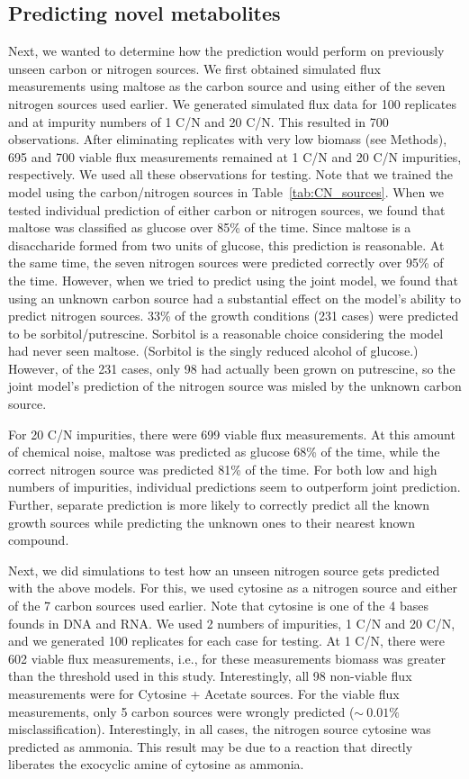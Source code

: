 \documentclass[12pt]{article}
\begin{document}
\subsection{Predicting novel metabolites}

Next, we wanted to determine how the prediction would perform on previously unseen carbon or nitrogen sources. We first obtained simulated flux measurements using maltose as the carbon source and using either of the seven nitrogen sources used earlier. We generated simulated flux data for 100 replicates and at impurity numbers of 1 C/N and 20 C/N. This resulted in 700 observations. After eliminating replicates with very low biomass (see Methods), 695 and 700 viable flux measurements remained at 1 C/N and 20 C/N impurities, respectively. We used all these observations for testing. Note that we trained the model using the carbon/nitrogen sources in Table~\ref{tab:CN_sources}. When we tested individual prediction of either carbon or nitrogen sources, we found that maltose was classified as glucose over 85\% of the time. Since maltose is a disaccharide formed from two units of glucose, this prediction is reasonable. At the same time, the seven nitrogen sources were predicted correctly over 95\% of the time. However, when we tried to predict using the joint model, we found that using an unknown carbon source had a substantial effect on the model's ability to predict nitrogen sources. 33\% of the growth conditions (231 cases) were predicted to be sorbitol/putrescine. Sorbitol is a reasonable choice considering the model had never seen maltose. (Sorbitol is the singly reduced alcohol of glucose.) However, of the 231 cases, only 98 had actually been grown on putrescine, so the joint model's prediction of the nitrogen source was misled by the unknown carbon source.

For 20 C/N impurities, there were 699 viable flux measurements. At this amount of chemical noise, maltose was predicted as glucose 68\% of the time, while the correct nitrogen source was predicted 81\% of the time. For both low and high numbers of impurities, individual predictions seem to outperform joint prediction. Further, separate prediction is more likely to correctly predict all the known growth sources while predicting the unknown ones to their nearest known compound.

Next, we did simulations to test how an unseen nitrogen source gets predicted with the above models. For this, we used cytosine as a nitrogen source and either of the 7 carbon sources used earlier. Note that cytosine is one of the 4 bases founds in DNA and RNA. We used 2 numbers of impurities, 1 C/N and 20 C/N, and we generated 100 replicates for each case for testing. At 1 C/N, there were 602 viable flux measurements, i.e., for these measurements biomass was greater than the threshold used in this study. Interestingly, all 98 non-viable flux measurements were for Cytosine + Acetate sources. For the viable flux measurements, only 5 carbon sources were wrongly predicted ($\sim~0.01\%$ misclassification). Interestingly, in all cases, the nitrogen source cytosine was predicted as ammonia. This result may be due to a reaction that directly liberates the exocyclic amine of cytosine as ammonia.
\end{document}
